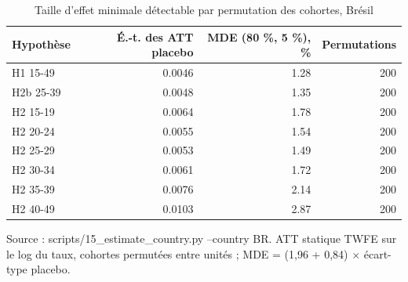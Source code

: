 \begin{table}[htbp]\centering
\begin{threeparttable}
\caption{Taille d'effet minimale détectable par permutation des cohortes, Brésil}\label{tab:br_mde}
\small
\begin{tabular}{lrrr}
\toprule
Hypothèse & É.-t. des ATT placebo & MDE (80 \%, 5 \%), \% & Permutations \\
\midrule
H1 15-49 & 0.0046 & 1.28 & 200 \\
H2b 25-39 & 0.0048 & 1.35 & 200 \\
H2 15-19 & 0.0064 & 1.78 & 200 \\
H2 20-24 & 0.0055 & 1.54 & 200 \\
H2 25-29 & 0.0053 & 1.49 & 200 \\
H2 30-34 & 0.0061 & 1.72 & 200 \\
H2 35-39 & 0.0076 & 2.14 & 200 \\
H2 40-49 & 0.0103 & 2.87 & 200 \\
\bottomrule
\end{tabular}
\begin{tablenotes}\footnotesize
\item Source : scripts/15\_estimate\_country.py --country BR. ATT statique TWFE sur le log du taux, cohortes permutées entre unités ; MDE = (1,96 + 0,84) $\times$ écart-type placebo.
\end{tablenotes}
\end{threeparttable}
\end{table}
